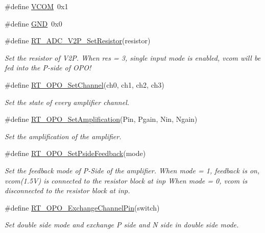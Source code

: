 \begin{DoxyCompactItemize}
\item 
\#define \mbox{\hyperlink{a00002_af5ad26ac9fe7dfd16ab8c8219b24ec93}{V\+C\+OM}}~0x1
\item 
\#define \mbox{\hyperlink{a00002_a2c058e9d24bb65c1a6ad2d439b2976ab}{G\+ND}}~0x0
\item 
\#define \mbox{\hyperlink{a00002_ab24203a1eff5816f48761f0e38337d67}{R\+T\+\_\+\+A\+D\+C\+\_\+\+V2\+P\+\_\+\+Set\+Resistor}}(resistor)
\begin{DoxyCompactList}\small\item\em Set the resistor of V2P. When res = 3, single input mode is enabled, vcom will be fed into the P-\/side of O\+P\+O! \end{DoxyCompactList}\item 
\#define \mbox{\hyperlink{a00002_a5867d7cb8e45d61e08c23747ad488ff8}{R\+T\+\_\+\+O\+P\+O\+\_\+\+Set\+Channel}}(ch0,  ch1,  ch2,  ch3)
\begin{DoxyCompactList}\small\item\em Set the state of every amplifier channel. \end{DoxyCompactList}\item 
\#define \mbox{\hyperlink{a00002_ab2a6c21c91c7f05f3de9fefbd30ff95b}{R\+T\+\_\+\+O\+P\+O\+\_\+\+Set\+Amplification}}(Pin,  Pgain,  Nin,  Ngain)
\begin{DoxyCompactList}\small\item\em Set the amplification of the amplifier. \end{DoxyCompactList}\item 
\#define \mbox{\hyperlink{a00002_ab5cbc0bc53f5cb140673c5213ba30407}{R\+T\+\_\+\+O\+P\+O\+\_\+\+Set\+Pside\+Feedback}}(mode)
\begin{DoxyCompactList}\small\item\em Set the feedback mode of P-\/\+Side of the amplifier. When mode = 1, feedback is on, vcom(1.\+5V) is connected to the resistor block at inp When mode = 0, vcom is disconnected to the resistor block at inp. \end{DoxyCompactList}\item 
\#define \mbox{\hyperlink{a00002_a1846f829df60ca42a455a1688eee7310}{R\+T\+\_\+\+O\+P\+O\+\_\+\+Exchange\+Channel\+Pin}}(switch)
\begin{DoxyCompactList}\small\item\em Set double side mode and exchange P side and N side in double side mode. \end{DoxyCompactList}\item 

\end{DoxyCompactItemize}
